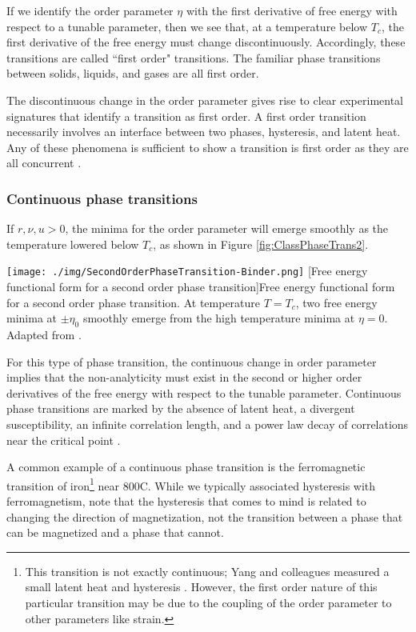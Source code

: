 If we identify the order parameter $\eta$ with the first derivative of free energy with respect to a tunable parameter, then we see that, at a temperature below $T_{c}$, the first derivative of the free energy must change discontinuously. Accordingly, these transitions are called ``first order" transitions. The familiar phase transitions between solids, liquids, and gases are all first order. 

The discontinuous change in the order parameter gives rise to clear experimental signatures that identify a transition as first order. A first order transition necessarily involves an interface between two phases, hysteresis, and latent heat. Any of these phenomena is sufficient to show a transition is first order as they are all concurrent \cite{Mnyukh2011}.

\subsubsection{Continuous phase transitions}

If $r,\nu,u > 0$, the minima for the order parameter will emerge smoothly as the temperature lowered below $T_{c}$, as shown in Figure \ref{fig:ClassPhaseTrans2}.

\begin{centering}
\texttt{[image: ./img/SecondOrderPhaseTransition-Binder.png]}
  \captionsetup{width=0.9\textwidth}
  [Free energy functional form for a second order phase transition]{Free energy functional form for a second order phase transition. At temperature  $T = T_{c}$, two free energy minima at $\pm \eta_{0}$ smoothly emerge from the high temperature minima at $\eta = 0$.  Adapted from \cite{Binder1987}.}
  \label{fig:ClassPhaseTrans2}
\end{centering}

For this type of phase transition, the continuous change in order parameter implies that the non-analyticity must exist in the second or higher order derivatives of the free energy with respect to the tunable parameter. Continuous phase transitions are marked by the absence of latent heat, a divergent susceptibility, an infinite correlation length, and a power law decay of correlations near the critical point \cite{Cardy1996}.

A common example of a continuous phase transition is the ferromagnetic transition of iron\footnote{This transition is not exactly continuous; Yang and colleagues measured a small latent heat and hysteresis \cite{Yang2008}. However, the first order nature of this particular transition may be due to the coupling of the order parameter to other parameters like strain.} near 800\degree C. While we typically associated hysteresis with ferromagnetism, note that the hysteresis that comes to mind is related to changing the direction of magnetization, not the transition between a phase that can be magnetized and a phase that cannot. 

